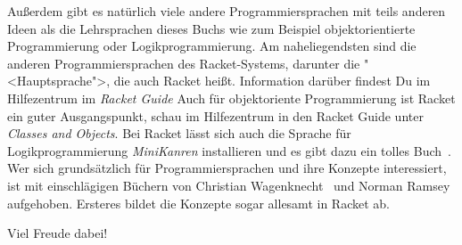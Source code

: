 %
Außerdem gibt es natürlich viele andere Programmiersprachen mit teils
anderen Ideen als die Lehrsprachen dieses Buchs wie zum Beispiel
objektorientierte Programmierung oder Logikprogrammierung.  Am
naheliegendsten sind die anderen Programmiersprachen des
Racket-Systems, darunter die "<Hauptsprache">, die auch Racket heißt.
Information darüber findest Du im Hilfezentrum im \textit{Racket
  Guide} Auch für objektoriente Programmierung ist Racket ein guter
Ausgangspunkt, schau im Hilfezentrum in den Racket Guide unter
\textit{Classes and Objects}.  Bei Racket lässt sich auch die Sprache
für Logikprogrammierung \textit{MiniKanren} installieren und es gibt
dazu ein tolles Buch~\cite{FriedmanEtAl2018}.  Wer sich grundsätzlich
für Programmiersprachen und ihre Konzepte interessiert, ist mit
einschlägigen Büchern von Christian Wagenknecht~\cite{Wagenknecht2016}
und Norman Ramsey~\cite{Ramsey2022} aufgehoben.  Ersteres bildet die
Konzepte sogar allesamt in Racket ab.

Viel Freude dabei!

